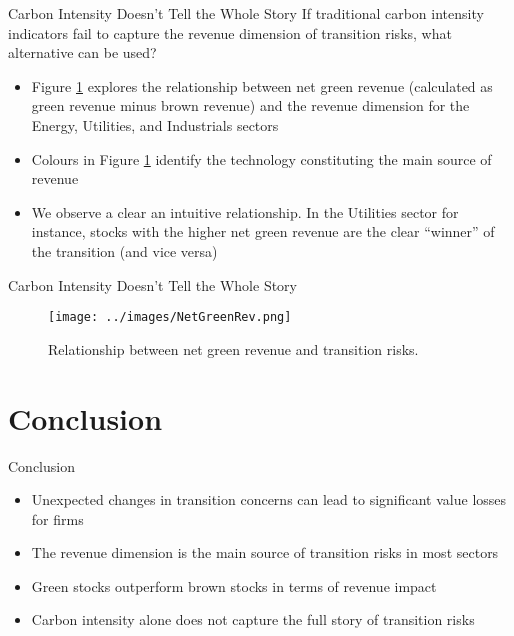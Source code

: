 \documentclass{beamer}
\begin{document}
\begin{frame}{Carbon Intensity Doesn't Tell the Whole Story}
  If traditional carbon intensity indicators fail to capture the revenue dimension of transition risks, what alternative can be used?
  \begin{itemize}
    \item Figure \ref{fig:greenrev} explores the relationship between net green revenue (calculated as green revenue minus brown revenue) and the revenue dimension for the Energy, Utilities, and Industrials sectors
    \item Colours in Figure \ref{fig:greenrev} identify the technology constituting the main source of revenue
    \item We observe a clear an intuitive relationship. In the Utilities sector for instance, stocks with the higher net green revenue are the clear “winner” of the transition (and vice versa)
  \end{itemize}

\end{frame}

\begin{frame}{Carbon Intensity Doesn't Tell the Whole Story}
  \begin{figure}
    \centering
    \texttt{[image: ../images/NetGreenRev.png]}
    \caption{Relationship between net green revenue and transition risks.}
    \label{fig:greenrev}
  \end{figure}

\end{frame}

\section{Conclusion}

\begin{frame}{Conclusion}
  \begin{itemize}
    \item Unexpected changes in transition concerns can lead to significant value losses for firms
    \item The revenue dimension is the main source of transition risks in most sectors
    \item Green stocks outperform brown stocks in terms of revenue impact
    \item Carbon intensity alone does not capture the full story of transition risks
  \end{itemize}
\end{frame}
\end{document}
